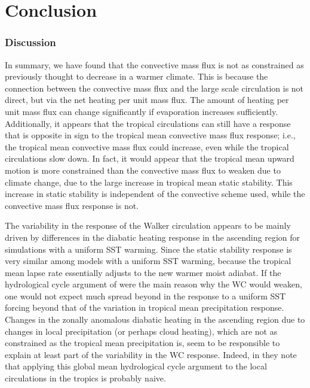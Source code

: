 \documentclass[letterpaper,12pt,titlepage,oneside,final]{book}
\begin{document}
\chapter{Conclusion}
\subsection{Discussion}
In summary, we have found that the convective mass flux is not as constrained as previously thought to decrease in a warmer climate. This is because the connection between the convective mass flux and the large scale circulation is not direct, but via the net heating per unit mass flux. The amount of heating per unit mass flux can change significantly if evaporation increases sufficiently. Additionally, it appears that the tropical circulations can still have a response that is opposite in sign to the tropical mean convective mass flux response; i.e., the tropical mean convective mass flux could increase, even while the tropical circulations slow down. In fact, it would appear that the tropical mean upward motion is more constrained than the convective mass flux to weaken due to climate change, due to the large increase in tropical mean static stability. This increase in static stability is independent of the convective scheme used, while the convective mass flux response is not.

The variability in the response of the Walker circulation appears to be mainly driven by differences in the diabatic heating response in the ascending region for simulations with a uniform SST warming. Since the static stability response is very similar among models with a uniform SST warming, because the tropical mean lapse rate essentially adjusts to the new warmer moist adiabat. If the hydrological cycle argument of \citep{held_robust_2006} were the main reason why the WC would weaken, one would not expect much spread beyond in the response to a uniform SST forcing beyond that of the variation in tropical mean precipitation response. Changes in the zonally anomalous diabatic heating in the ascending region due to changes in local precipitation (or perhaps cloud heating), which are not as constrained as the tropical mean precipitation is, seem to be responsible to explain at least part of the variability in the WC response. Indeed, in \citep{schneider_water_2010} they note that applying this global mean hydrological cycle argument to the local circulations in the tropics is probably naive.
\end{document}
